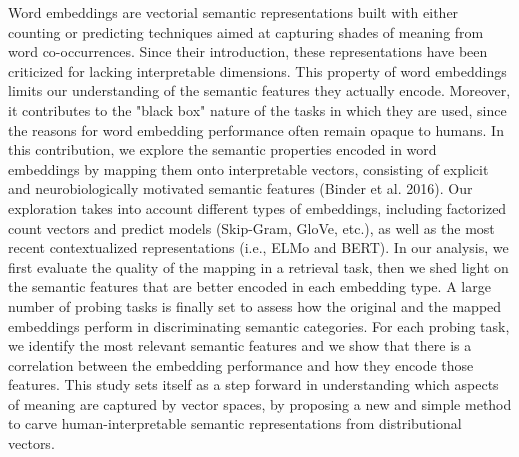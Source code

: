 Word embeddings are vectorial semantic representations built with either counting or predicting techniques aimed at capturing shades of meaning from word co-occurrences. Since their introduction, these representations have been criticized for lacking interpretable dimensions. This property of word embeddings limits our understanding of the semantic features they actually encode. Moreover, it contributes to the "black box" nature of the tasks in which they are used, since the reasons for word embedding performance often remain opaque to humans. In this contribution, we explore the semantic properties encoded in word embeddings by mapping them onto interpretable vectors, consisting of explicit and neurobiologically motivated semantic features (Binder et al. 2016). Our exploration takes into account different types of embeddings, including factorized count vectors and predict models (Skip-Gram, GloVe, etc.), as well as the most recent contextualized representations (i.e., ELMo and BERT). In our analysis, we first evaluate the quality of the mapping in a retrieval task, then we shed light on the semantic features that are better encoded in each embedding type. A large number of probing tasks is finally set to assess how the original and the mapped embeddings perform in discriminating semantic categories. For each probing task, we identify the most relevant semantic features and we show that there is a correlation between the embedding performance and how they encode those features. This study sets itself as a step forward in understanding which aspects of meaning are captured by vector spaces, by proposing a new and simple method to carve human-interpretable semantic representations from distributional vectors.